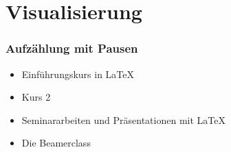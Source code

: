 \section{Visualisierung}
\begin{frame}
\frametitle{Aufz\"ahlung mit Pausen}
\begin{itemize}[<+->]
\item  Einf\"uhrungskurs in \LaTeX{} 
\item  Kurs 2 
\item  Seminararbeiten und Pr\"asentationen mit \LaTeX{} 
\item  Die Beamerclass
\end{itemize} 
\end{frame}
